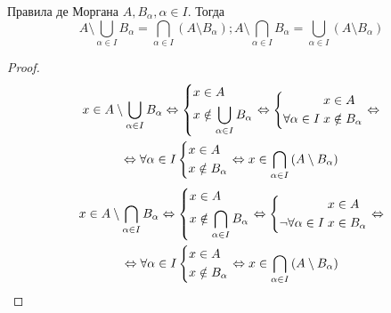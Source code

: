 \begin{theorem}{Правила де Моргана}
$ A, B_\alpha, \alpha \in I $.
Тогда 
$$ A \setminus \bigcup_{\alpha \in I} B_\alpha = \bigcap_{\alpha \in I} \left(A \setminus B_\alpha\right) ; 
A \setminus \bigcap_{\alpha \in I} B_\alpha = \bigcup_{\alpha \in I} \left(A \setminus B_\alpha\right) $$
\end{theorem} 
\begin{proof}
\begin{multline*}
x \in A \setminus \bigcup_{\alpha \in I} B_{\alpha} \Leftrightarrow \left\{\begin{aligned}x &\in A \\ x &\notin \bigcup_{\alpha \in I} B_{\alpha}\end{aligned}\right. \Leftrightarrow 
\left\{\begin{aligned} x &\in A \\ \forall \alpha \in I\; x &\notin B_\alpha \end{aligned}\right. \Leftrightarrow \\ \Leftrightarrow
\forall \alpha \in I \left\{\begin{aligned} x &\in A \\ x &\notin B_\alpha \end{aligned}\right.  
\Leftrightarrow x \in \bigcap_{\alpha \in I} \left(A \setminus B_\alpha\right) 
\end{multline*}
\begin{multline*}
x \in A \setminus \bigcap_{\alpha \in I} B_{\alpha} \Leftrightarrow \left\{\begin{aligned}x &\in A \\ x &\notin \bigcap_{\alpha \in I} B_{\alpha}\end{aligned}\right. \Leftrightarrow 
\left\{\begin{aligned} x &\in A \\ \lnot \forall \alpha \in I\; x &\in B_\alpha \end{aligned}\right. \Leftrightarrow \\ \Leftrightarrow
\forall \alpha \in I \left\{\begin{aligned} x &\in A \\ x &\notin B_\alpha \end{aligned}\right.  
\Leftrightarrow x \in \bigcap_{\alpha \in I} \left(A \setminus B_\alpha\right) 
\end{multline*}
\end{proof}

